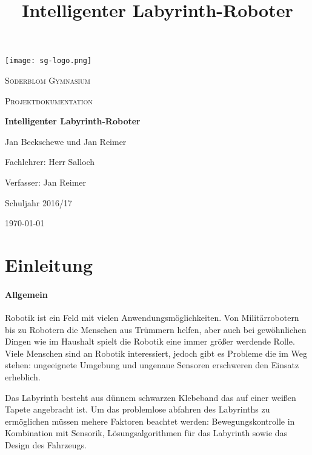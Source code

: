 \documentclass[12pt]{article}
\title{Intelligenter Labyrinth-Roboter}
\begin{document}
\begin{titlepage}
	\centering
	\texttt{[image: sg-logo.png]}\par\vspace{1cm}
	{\scshape\LARGE Söderblom Gymnasium \par}
	\vspace{1cm}
	{\scshape\Large Projektdokumentation\par}
	\vspace{1.5cm}
	{\huge\bfseries Intelligenter Labyrinth-Roboter\par}
	\vspace{1.5cm}
	{\Large Jan Beckschewe und Jan Reimer \par}
	\vspace{1.5cm}
	Fachlehrer: Herr Salloch \par
    \vspace{0.5cm}
    Verfasser: Jan Reimer \par
    \vspace{1cm}
	Schuljahr 2016/17 \par
    
	\vfill

	{\large \today\par}
\end{titlepage}
\restoregeometry
\tableofcontents
\thispagestyle{empty}
\newpage
\setcounter{page}{3}
\section{Einleitung}
\paragraph{Allgemein} Robotik ist ein Feld mit vielen Anwendungsmöglichkeiten. Von Militärrobotern bis zu Robotern die Menschen aus Trümmern helfen, aber auch bei gewöhnlichen Dingen wie im Haushalt spielt die Robotik eine immer größer werdende Rolle. Viele Menschen sind an Robotik interessiert, jedoch gibt es Probleme die im Weg stehen: ungeeignete Umgebung und ungenaue Sensoren erschweren den Einsatz erheblich.  

Das Labyrinth besteht aus dünnem schwarzen Klebeband das auf einer weißen Tapete angebracht ist. Um das problemlose abfahren des Labyrinths zu ermöglichen müssen mehere Faktoren beachtet werden: Bewegungskontrolle in Kombination mit Sensorik, Lösungsalgorithmen für das Labyrinth sowie das Design des Fahrzeugs.
\end{document}
